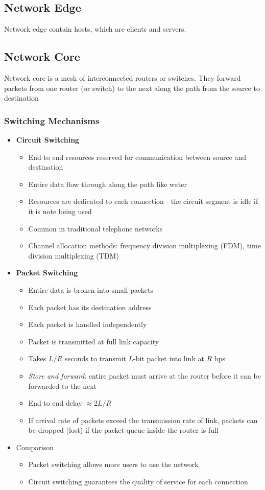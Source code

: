 \subsection{Network Edge}
Network edge contain hosts, which are clients and servers.

\subsection{Network Core}
Network core is a mesh of interconnected routers or switches. They forward packets from one router (or switch) to the next along the path from the source to destination

\subsubsection{Switching Mechanisms}
\begin{itemize}
	\item \textbf{Circuit Switching}
	\begin{itemize}
		\item End to end resources reserved for communication between source and destination
		\item Entire data flow through along the path like water
		\item Resources are dedicated to each connection - the circuit segment is idle if it is note being used
		\item Common in traditional telephone networks
		\item Channel allocation methods: frequency division multiplexing (FDM), time division multiplexing (TDM)
	\end{itemize}
	\item \textbf{Packet Switching}
	\begin{itemize}
		\item Entire data is broken into small packets
		\item Each packet has its destination address
		\item Each packet is handled independently
		\item Packet is transmitted at full link capacity
		\item Takes $L/R$ seconds to transmit $L$-bit packet into link at $R$ bps
		\item \textit{Store and forward}: entire packet must arrive at the router before it can be forwarded to the next
		\item End to end delay $\approx 2L/R$
		\item If arrival rate of packets exceed the transmission rate of link, packets can be dropped (lost) if the packet queue inside the router is full
	\end{itemize}
	\item Comparison
	\begin{itemize}
		\item Packet switching allows more users to use the network
		\item Circuit switching guarantees the quality of service for each connection
	\end{itemize}
\end{itemize}

